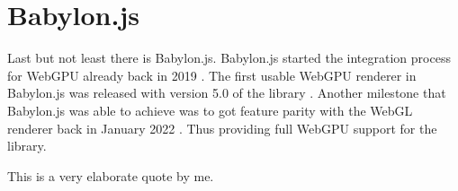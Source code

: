 \section{Babylon.js}

Last but not least there is Babylon.js.
Babylon.js started the integration process for WebGPU already back in 2019 \cite{babylon_start_webgpu}. 
The first usable WebGPU renderer in Babylon.js was released with version 5.0 of the library \cite{babylon_released}.
Another milestone that Babylon.js was able to achieve was to got feature parity with the WebGL renderer back in January 2022 \cite{babylon_parity}.
Thus providing full WebGPU support for the library.


\begin{displayquote}
  This is a very elaborate quote by me.
\end{displayquote}
